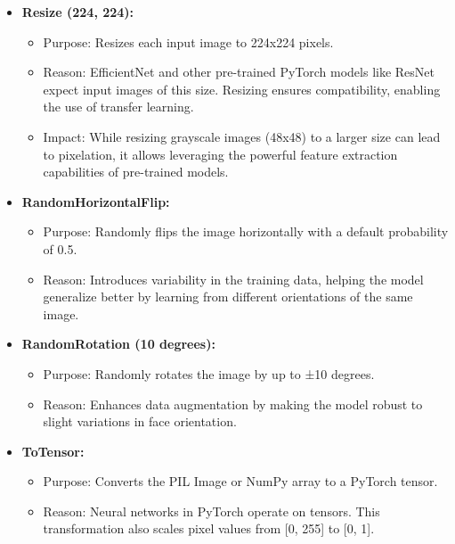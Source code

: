 \documentclass{article}
\begin{document}
\begin{itemize}
    \item \textbf{Resize (224, 224):}
    \begin{itemize}
        \item Purpose: Resizes each input image to 224x224 pixels.
        \item Reason: EfficientNet and other pre-trained PyTorch models like ResNet expect input images of this size. Resizing ensures compatibility, enabling the use of transfer learning.
        \item Impact: While resizing grayscale images (48x48) to a larger size can lead to pixelation, it allows leveraging the powerful feature extraction capabilities of pre-trained models.
    \end{itemize}
    
    \item \textbf{RandomHorizontalFlip:}
    \begin{itemize}
        \item Purpose: Randomly flips the image horizontally with a default probability of 0.5.
        \item Reason: Introduces variability in the training data, helping the model generalize better by learning from different orientations of the same image.
    \end{itemize}
    
    \item \textbf{RandomRotation (10 degrees):}
    \begin{itemize}
        \item Purpose: Randomly rotates the image by up to ±10 degrees.
        \item Reason: Enhances data augmentation by making the model robust to slight variations in face orientation.
    \end{itemize}
    
    \item \textbf{ToTensor:}
    \begin{itemize}
        \item Purpose: Converts the PIL Image or NumPy array to a PyTorch tensor.
        \item Reason: Neural networks in PyTorch operate on tensors. This transformation also scales pixel values from [0, 255] to [0, 1].
    \end{itemize}
    

\end{itemize}
\end{document}
